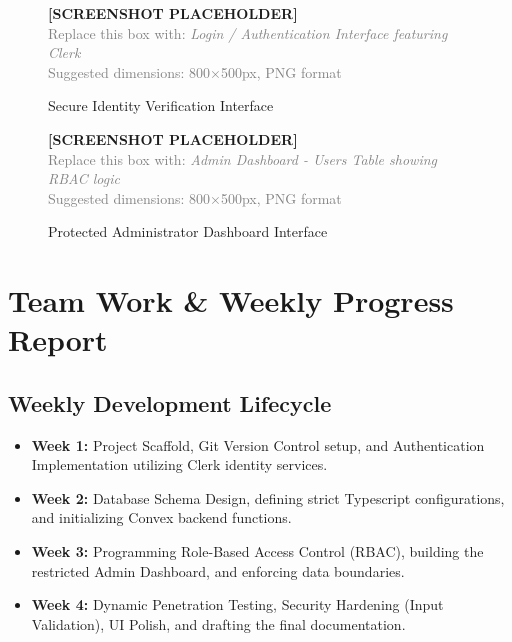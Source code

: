 \documentclass[12pt,a4paper]{report}
\begin{document}
\begin{figure}[H]
  \centering
  \begin{mdframed}[backgroundcolor=lightgray, linecolor=accentblue, linewidth=1.5pt]
    \centering
    \vspace{1.5cm}
    \textbf{\large [SCREENSHOT PLACEHOLDER]}\\[0.5em]
    \textcolor{gray}{Replace this box with: \textit{Login / Authentication Interface featuring Clerk}}\\[0.3em]
    \textcolor{gray}{Suggested dimensions: 800×500px, PNG format}
    \vspace{1.5cm}
  \end{mdframed}
  \caption{Secure Identity Verification Interface}
\end{figure}

\begin{figure}[H]
  \centering
  \begin{mdframed}[backgroundcolor=lightgray, linecolor=accentblue, linewidth=1.5pt]
    \centering
    \vspace{1.5cm}
    \textbf{\large [SCREENSHOT PLACEHOLDER]}\\[0.5em]
    \textcolor{gray}{Replace this box with: \textit{Admin Dashboard - Users Table showing RBAC logic}}\\[0.3em]
    \textcolor{gray}{Suggested dimensions: 800×500px, PNG format}
    \vspace{1.5cm}
  \end{mdframed}
  \caption{Protected Administrator Dashboard Interface}
\end{figure}


\chapter{Team Work \& Weekly Progress Report}

\section{Weekly Development Lifecycle}
\begin{itemize}
    \item \textbf{Week 1:} Project Scaffold, Git Version Control setup, and Authentication Implementation utilizing Clerk identity services.
    \item \textbf{Week 2:} Database Schema Design, defining strict Typescript configurations, and initializing Convex backend functions.
    \item \textbf{Week 3:} Programming Role-Based Access Control (RBAC), building the restricted Admin Dashboard, and enforcing data boundaries.
    \item \textbf{Week 4:} Dynamic Penetration Testing, Security Hardening (Input Validation), UI Polish, and drafting the final documentation.
\end{itemize}
\end{document}
